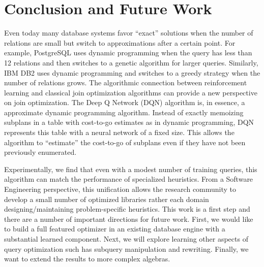 \section{Conclusion and Future Work}
Even today many database systems favor ``exact'' solutions when the number of relations are small but switch to approximations after a certain point.
For example, PostgreSQL uses dynamic programming when the query has less than 12 relations and
then switches to a genetic algorithm for larger queries. 
Similarly, IBM DB2 uses dynamic programming and switches to a greedy strategy when the number of relations grows.
The algorithmic connection between reinforcement learning and classical join optimization algorithms can provide a new perspective on join optimization.
The Deep Q Network (DQN) algorithm is, in essence, a approximate dynamic programming algorithm.
Instead of exactly memoizing subplans in a table with cost-to-go estimates as in dynamic programming, DQN represents this table with a neural network of a fixed size.
This allows the algorithm to ``estimate'' the cost-to-go of subplans even if they have not been previously enumerated.

Experimentally, we find that even with a modest number of training queries, this algorithm can match the performance of specialized heuristics.
From a Software Engineering perspective, this unification allows the research community to develop a small number of optimized libraries  rather each domain designing/maintaining problem-specific heuristics.
This work is a first step and there are a number of important directions for future work.
First, we would like to build a full featured optimizer in an existing database engine with a substantial learned component.
Next, we will explore learning other aspects of query optimization such has subquery manipulation and rewriting.
Finally, we want to extend the results to more complex algebras.


